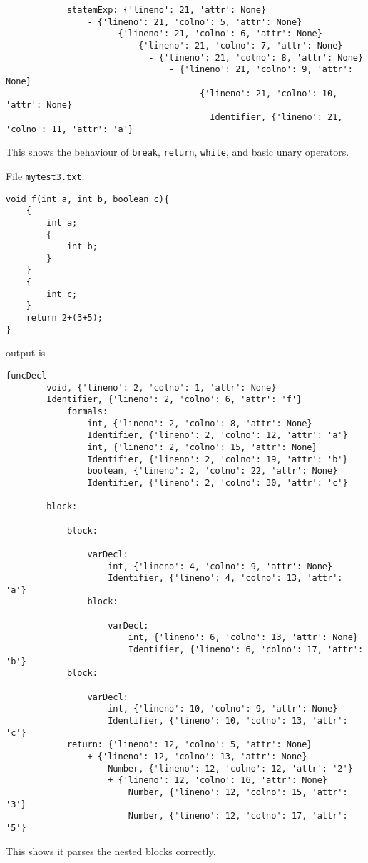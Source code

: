 \documentclass{article}
\begin{document}
\begin{itemize}
\begin{verbatim}
            statemExp: {'lineno': 21, 'attr': None}
                - {'lineno': 21, 'colno': 5, 'attr': None}
                    - {'lineno': 21, 'colno': 6, 'attr': None}
                        - {'lineno': 21, 'colno': 7, 'attr': None}
                            - {'lineno': 21, 'colno': 8, 'attr': None}
                                - {'lineno': 21, 'colno': 9, 'attr': None}
                                    - {'lineno': 21, 'colno': 10, 'attr': None}
                                        Identifier, {'lineno': 21, 'colno': 11, 'attr': 'a'}
        \end{verbatim}
        This shows the behaviour of \verb|break|, \verb|return|, \verb|while|, and basic unary operators.

        File \verb|mytest3.txt|:
        \begin{verbatim}
void f(int a, int b, boolean c){
    {
        int a;
        {
            int b;
        }
    }
    {
        int c;
    }
    return 2+(3+5);
}
        \end{verbatim}
        output is
        \begin{verbatim}
funcDecl
        void, {'lineno': 2, 'colno': 1, 'attr': None}
        Identifier, {'lineno': 2, 'colno': 6, 'attr': 'f'}
            formals:
                int, {'lineno': 2, 'colno': 8, 'attr': None}
                Identifier, {'lineno': 2, 'colno': 12, 'attr': 'a'}
                int, {'lineno': 2, 'colno': 15, 'attr': None}
                Identifier, {'lineno': 2, 'colno': 19, 'attr': 'b'}
                boolean, {'lineno': 2, 'colno': 22, 'attr': None}
                Identifier, {'lineno': 2, 'colno': 30, 'attr': 'c'}

        block:

            block:

                varDecl:
                    int, {'lineno': 4, 'colno': 9, 'attr': None}
                    Identifier, {'lineno': 4, 'colno': 13, 'attr': 'a'}
                block:

                    varDecl:
                        int, {'lineno': 6, 'colno': 13, 'attr': None}
                        Identifier, {'lineno': 6, 'colno': 17, 'attr': 'b'}
            block:

                varDecl:
                    int, {'lineno': 10, 'colno': 9, 'attr': None}
                    Identifier, {'lineno': 10, 'colno': 13, 'attr': 'c'}
            return: {'lineno': 12, 'colno': 5, 'attr': None}
                + {'lineno': 12, 'colno': 13, 'attr': None}
                    Number, {'lineno': 12, 'colno': 12, 'attr': '2'}
                    + {'lineno': 12, 'colno': 16, 'attr': None}
                        Number, {'lineno': 12, 'colno': 15, 'attr': '3'}
                        Number, {'lineno': 12, 'colno': 17, 'attr': '5'}
        \end{verbatim}
        This shows it parses the nested blocks correctly.


\end{itemize}
\end{document}
